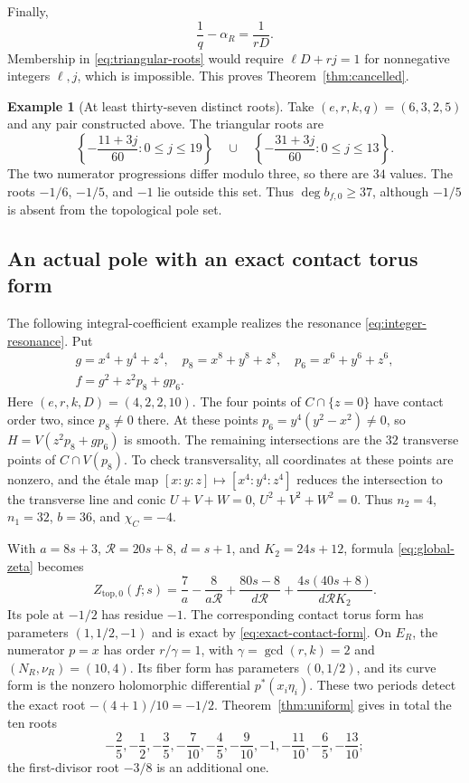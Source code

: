 \documentclass[11pt]{article}
\numberwithin{equation}{section}
\theoremstyle{definition}
\newtheorem{example}[theorem]{Example}
\theoremstyle{remark}
\newcommand{\bfzero}{b_{f,0}}
\begin{document}
Finally,
\[
 \frac1q-\alpha_R=\frac1{rD}.
\]
Membership in \eqref{eq:triangular-roots} would require
$\ell D+rj=1$ for nonnegative integers $\ell,j$, which
is impossible. This proves Theorem~\ref{thm:cancelled}.

\begin{example}[At least thirty-seven distinct roots]
\label{ex:thirty-seven}
Take $(e,r,k,q)=(6,3,2,5)$ and any pair constructed above.
The triangular roots are
\[
 \left\{-\frac{11+3j}{60}:0\le j\le19\right\}
 \quad\cup\quad
 \left\{-\frac{31+3j}{60}:0\le j\le13\right\}.
\]
The two numerator progressions differ modulo three, so
there are $34$ values. The roots $-1/6$, $-1/5$, and
$-1$ lie outside this set. Thus $\deg\bfzero\ge37$,
although $-1/5$ is absent from the topological pole set.
\end{example}

\subsection{An actual pole with an exact contact torus form}

The following integral-coefficient example realizes the
resonance \eqref{eq:integer-resonance}. Put
\begin{equation}\label{eq:integer-example}
 \begin{gathered}
 g=x^4+y^4+z^4,\quad p_8=x^8+y^8+z^8,\quad
 p_6=x^6+y^6+z^6,\\
 f=g^2+z^2p_8+gp_6.
 \end{gathered}
\end{equation}
Here $(e,r,k,D)=(4,2,2,10)$. The four points of
$C\cap\{z=0\}$ have contact order two, since $p_8\ne0$
there. At these points $p_6=y^4(y^2-x^2)\ne0$, so
$H=V(z^2p_8+gp_6)$ is smooth. The remaining intersections
are the $32$ transverse points of $C\cap V(p_8)$.
To check transversality, all coordinates at these points
are nonzero, and the \'etale map
$[x:y:z]\mapsto[x^4:y^4:z^4]$ reduces the intersection
to the transverse line and conic
$U+V+W=0$, $U^2+V^2+W^2=0$.
Thus $n_2=4$, $n_1=32$, $b=36$, and $\chi_C=-4$.

With $a=8s+3$, $\mathcal R=20s+8$, $d=s+1$, and
$K_2=24s+12$, formula \eqref{eq:global-zeta} becomes
\begin{equation}\label{eq:example-zeta}
 Z_{\mathrm{top},0}(f;s)
   =\frac7a-\frac8{a\mathcal R}
       +\frac{80s-8}{d\mathcal R}
       +\frac{4s(40s+8)}{d\mathcal R K_2}.
\end{equation}
Its pole at $-1/2$ has residue $-1$. The corresponding
contact torus form has parameters $(1,1/2,-1)$ and is
exact by \eqref{eq:exact-contact-form}.
On $E_R$, the numerator $p=x$ has order $r/\gamma=1$,
with $\gamma=\gcd(r,k)=2$ and $(N_R,\nu_R)=(10,4)$.
Its fiber form has parameters
$(0,1/2)$, and its curve form is the nonzero holomorphic
differential $p^*(x_i\eta_i)$. These two periods detect
the exact root $-(4+1)/10=-1/2$.
Theorem~\ref{thm:uniform} gives in total the ten roots
\[
 -\frac25,-\frac12,-\frac35,-\frac7{10},-\frac45,
 -\frac9{10},-1,-\frac{11}{10},-\frac65,-\frac{13}{10};
\]
the first-divisor root $-3/8$ is an additional one.
\end{document}
